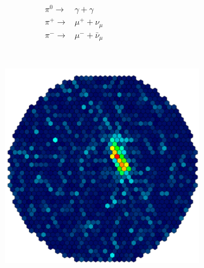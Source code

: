 \documentclass[aspectratio=1610, professionalfonts, 9pt]{beamer}
\begin{document}
\begin{frame}
\begin{columns}[onlytextwidth]
\begin{figure}
	  \cite{FACT}
	\end{figure}
	\begin{eqnarray*}
	  \pi^{0} \rightarrow& \gamma + \gamma \\
	  \pi^{+} \rightarrow& \mu^{+} + \nu_{\mu} \\
	  \pi^{-} \rightarrow& \mu^{-} + \bar{\nu}_{\mu}
	\end{eqnarray*}
  \end{columns}
\end{frame}

\begin{frame}
  \begin{columns}[onlytextwidth]
	\begin{figure}
	  \centering
	  \includegraphics[height=0.8\textheight]{./images/Gamma.pdf}
	  \cite{FACT}
	\end{figure}
	\begin{figure}
	  \centering

\end{figure}
\end{columns}
\end{frame}
\end{document}
